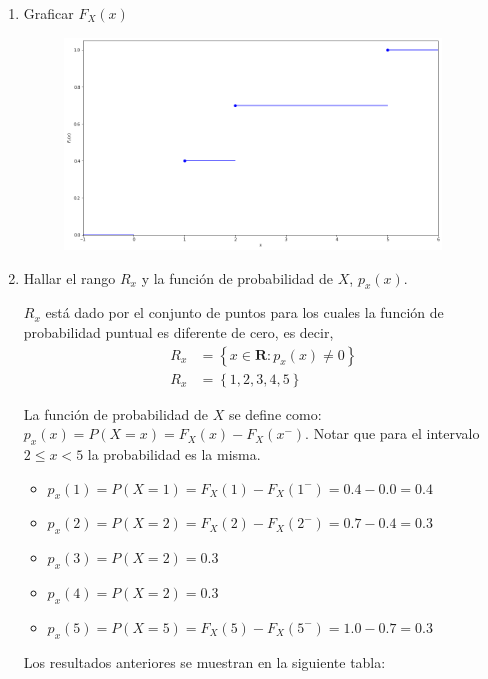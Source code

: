 \documentclass[a4paper,spanish]{article}
\begin{document}
\begin{enumerate}
    \item Graficar $F_X(x)$

          \begin{figure}[h]
              \includegraphics[width=10cm]{Fxx}
              \centering
          \end{figure}



    \item Hallar el rango $R_x$ y la función de probabilidad de $X$, $p_x(x)$.

          $R_x$ está dado por el conjunto de puntos para los cuales la función de probabilidad puntual es diferente de cero, es decir,
          \begin{align*}
              R_x & = \left\{ x \in \mathbf{R}: p_x(x) \neq 0 \right\} \\
              R_x & = \left\{ 1,2,3,4,5 \right\}
          \end{align*}

          La función de probabilidad de $X$ se define como: $p_x(x) = P(X=x) = F_X(x) - F_X(x^-)$. Notar que para el intervalo $2 \leq x < 5$ la probabilidad es la misma.
          \begin{itemize}
              \item $p_x(1) = P(X=1) = F_X(1) - F_X(1^-) = 0.4 - 0.0 = 0.4$
              \item $p_x(2) = P(X=2) = F_X(2) - F_X(2^-) = 0.7 - 0.4 = 0.3$
              \item $p_x(3) = P(X=2) = 0.3$
              \item $p_x(4) = P(X=2) = 0.3$
              \item $p_x(5) = P(X=5) = F_X(5) - F_X(5^-) = 1.0 - 0.7 = 0.3$
          \end{itemize}

          Los resultados anteriores se muestran en la siguiente tabla:


\end{enumerate}
\end{document}
